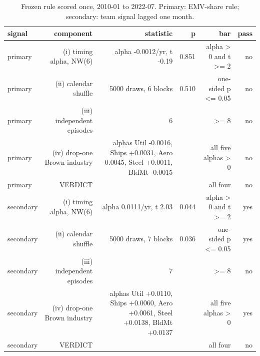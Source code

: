 \begin{table}[htbp]\centering\small
\caption{Frozen rule scored once, 2010-01 to 2022-07. Primary: EMV-share rule; secondary: team signal lagged one month.}
\label{tab:m8_passbar}
\begin{tabular}{lrrrrr}
\toprule
signal & component & statistic & p & bar & pass \\
\midrule
primary & (i) timing alpha, NW(6) & alpha -0.0012/yr, t -0.19 & 0.851 & alpha > 0 and t >= 2 & no \\
primary & (ii) calendar shuffle & 5000 draws, 6 blocks & 0.510 & one-sided p <= 0.05 & no \\
primary & (iii) independent episodes & 6 &  & >= 8 & no \\
primary & (iv) drop-one Brown industry & alphas Util -0.0016, Ships +0.0031, Aero -0.0045, Steel +0.0011, BldMt -0.0015 &  & all five alphas > 0 & no \\
primary & VERDICT &  &  & all four & no \\
secondary & (i) timing alpha, NW(6) & alpha 0.0111/yr, t 2.03 & 0.044 & alpha > 0 and t >= 2 & yes \\
secondary & (ii) calendar shuffle & 5000 draws, 7 blocks & 0.036 & one-sided p <= 0.05 & yes \\
secondary & (iii) independent episodes & 7 &  & >= 8 & no \\
secondary & (iv) drop-one Brown industry & alphas Util +0.0110, Ships +0.0060, Aero +0.0061, Steel +0.0138, BldMt +0.0137 &  & all five alphas > 0 & yes \\
secondary & VERDICT &  &  & all four & no \\
\bottomrule
\end{tabular}
\end{table}
